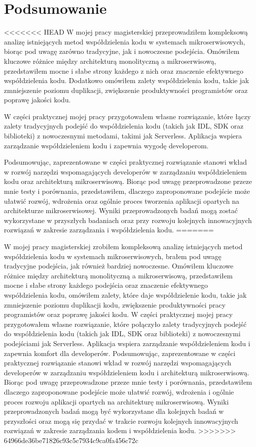 \documentclass[runningheads,12pt]{llncs}
\begin{document}
\section{Podsumowanie}

<<<<<<< HEAD
W mojej pracy magisterskiej przeprowadziłem kompleksową analizę istniejących metod współdzielenia kodu w systemach mikroserwisowych, biorąc pod uwagę zarówno tradycyjne, jak i nowoczesne podejścia. Omówiłem kluczowe różnice między architekturą monolityczną a mikroserwisową, przedstawiłem mocne i słabe strony każdego z nich oraz znaczenie efektywnego współdzielenia kodu. Dodatkowo omówiłem zalety współdzielenia kodu, takie jak zmniejszenie poziomu duplikacji, zwiększenie produktywności programistów oraz poprawę jakości kodu.

W części praktycznej mojej pracy przygotowałem własne rozwiązanie, które łączy zalety tradycyjnych podejść do współdzielenia kodu (takich jak IDL, SDK oraz biblioteki) z nowoczesnymi metodami, takimi jak Serverless. Aplikacja wspiera zarządzanie współdzieleniem kodu i zapewnia wygodę developerom.

Podsumowując, zaprezentowane w części praktycznej rozwiązanie stanowi wkład w rozwój narzędzi wspomagających developerów w zarządzaniu współdzieleniem kodu oraz architekturą mikroserwisową. Biorąc pod uwagę przeprowadzone przeze mnie testy i porównania, przedstawiłem, dlaczego zaproponowane podejście może ułatwić rozwój, wdrożenia oraz ogólnie proces tworzenia aplikacji opartych na architekturze mikroserwisowej. Wyniki przeprowadzonych badań mogą zostać wykorzystane w przyszłych badaniach oraz przy rozwoju kolejnych innowacyjnych rozwiązań w zakresie zarządzania i współdzielenia kodu.
=======

W mojej pracy magisterskiej zrobiłem kompleksową analizę istniejących metod współdzielenia kodu w systemach mikroserwisowych, brałem pod uwagę tradycyjne podejścia, jak również bardziej nowoczesne. Omówiłem kluczowe różnice między architekturą monolityczną a mikroserwisową, przedstawiłem mocne i słabe strony każdego podejścia oraz znaczenie efektywnego współdzielenia kodu, omówiłem zalety, które daje współdzielenie kodu, takie jak zmniejszenie poziomu duplikacji kodu, zwiększenie produktywności pracy programistów oraz poprawę jakości kodu.
W części praktycznej mojej pracy przygotowałem własne rozwiązanie, które połączyło zalety tradycyjnych podejść do współdzielenia kodu (takich jak IDL, SDK oraz biblioteki) z nowoczesnymi podejściami jak Serverless. Aplikacja wspiera zarządzanie współdzieleniem kodu i zapewnia komfort dla developerów.
Podsumowując, zaprezentowane w części praktycznej rozwiązanie stanowi wkład w rozwój narzędzi wspomagających developerów w zarządzaniu współdzieleniem kodu i architekturą mikroserwisową. Biorąc pod uwagę przeprowadzone przeze mnie testy i porównania, przedstawiłem dlaczego zaproponowane podejście może ułatwić rozwój, wdrożenia i ogólnie proces rozwoju aplikacji opartych na architekturę mikroserwisową. Wyniki przeprowadzonych badań mogą być wykorzystane dla kolejnych badań w przyszłości oraz mogą się przydać w trakcie rozwoju kolejnych innowacyjnych rozwiązań w zakresie zarządzania kodem i współdzielenia kodu.
>>>>>>> 64966de36be71826c93c5c7934c9ca0fa456c72c

\nocite{*}

\listoftables

\listoffigures



\end{document}
